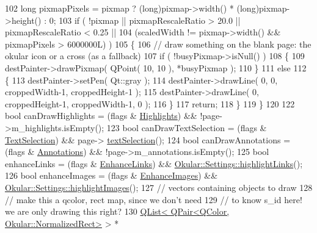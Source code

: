 \begin{DoxyCode}
102         \textcolor{keywordtype}{long} pixmapPixels = pixmap ? (long)pixmap->width() * (long)pixmap->height() : 0;
103         \textcolor{keywordflow}{if} ( !pixmap || pixmapRescaleRatio > 20.0 || pixmapRescaleRatio < 0.25 ||
104              (scaledWidth != pixmap->width() && pixmapPixels > 6000000L) )
105         \{
106             \textcolor{comment}{// draw something on the blank page: the okular icon or a cross (as a fallback)}
107             \textcolor{keywordflow}{if} ( !busyPixmap->isNull() )
108             \{
109                 destPainter->drawPixmap( QPoint( 10, 10 ), *busyPixmap );
110             \}
111             \textcolor{keywordflow}{else}
112             \{
113                 destPainter->setPen( Qt::gray );
114                 destPainter->drawLine( 0, 0, croppedWidth-1, croppedHeight-1 );
115                 destPainter->drawLine( 0, croppedHeight-1, croppedWidth-1, 0 );
116             \}
117             \textcolor{keywordflow}{return};
118         \}
119     \}
120 
122     \textcolor{keywordtype}{bool} canDrawHighlights = (flags & \hyperlink{classPagePainter_ae7f51ac72a598d2753cfc35ecdb51e01a3582deaa27eb857b1bbdd54e6174b3b5}{Highlights}) && !page->m\_highlights.isEmpty();
123     \textcolor{keywordtype}{bool} canDrawTextSelection = (flags & \hyperlink{classPagePainter_ae7f51ac72a598d2753cfc35ecdb51e01a76eae803a84abe4cdf3c21b73c2d266d}{TextSelection}) && page->
      \hyperlink{classOkular_1_1Page_a8b357ca7010d815f378094a7ba279a33}{textSelection}();
124     \textcolor{keywordtype}{bool} canDrawAnnotations = (flags & \hyperlink{classPagePainter_ae7f51ac72a598d2753cfc35ecdb51e01a87c63f97188bb13cbafd5ae63be3fe40}{Annotations}) && !page->m\_annotations.isEmpty();
125     \textcolor{keywordtype}{bool} enhanceLinks = (flags & \hyperlink{classPagePainter_ae7f51ac72a598d2753cfc35ecdb51e01a388b8bc0e65542c5b36324ed9331b982}{EnhanceLinks}) && 
      \hyperlink{classOkular_1_1Settings_ae49aa56e379f78d0295ce2afddfa7763}{Okular::Settings::highlightLinks}();
126     \textcolor{keywordtype}{bool} enhanceImages = (flags & \hyperlink{classPagePainter_ae7f51ac72a598d2753cfc35ecdb51e01acbf8b61fc5bea59ff83332b5219a8ed2}{EnhanceImages}) && 
      \hyperlink{classOkular_1_1Settings_a41a6c31cc235e4854b19ce95fde54e83}{Okular::Settings::highlightImages}();
127     \textcolor{comment}{// vectors containing objects to draw}
128     \textcolor{comment}{// make this a qcolor, rect map, since we don't need}
129     \textcolor{comment}{// to know s\_id here! we are only drawing this right?}
130     \hyperlink{classQList}{QList< QPair<QColor, Okular::NormalizedRect>} > * 

\end{DoxyCode}
